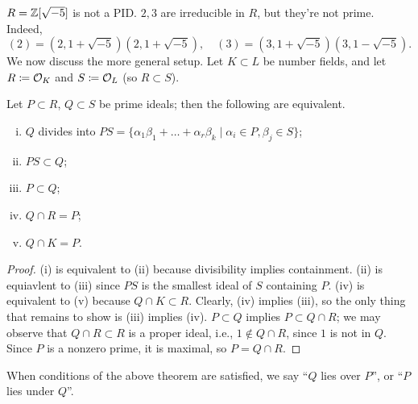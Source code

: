 $R = \mathbb Z[\sqrt{-5}]$ is not a PID. $2, 3$ are irreducible in $R$, but they're not prime. Indeed,
\[ (2) = (2, 1 + \sqrt{-5}) (2, 1 + \sqrt{-5}), \quad (3) = (3, 1 + \sqrt{-5})(3, 1 - \sqrt{-5}). \]
We now discuss the more general setup. Let $K \subset L$ be number fields, and let $R \coloneq \mathcal O_K$ and $S \coloneq \mathcal O_L$ (so $R \subset S$).
\begin{theorem} \label{thm:prime_ideals_of_number_fields_properties}
    Let $P \subset R$, $Q \subset S$ be prime ideals; then the following are equivalent.
    \begin{enumerate}[(i)]
        \item $Q$ divides into $P S = \{\alpha_1 \beta_1 + \dots + \alpha_r \beta_k \mid \alpha_i \in P, \beta_j \in S\}$;
        \item $PS \subset Q$;
        \item $P \subset Q$;
        \item $Q \cap R = P$;
        \item $Q \cap K = P$.
    \end{enumerate}
\end{theorem}
\begin{proof}
    (i) is equivalent to (ii) because divisibility implies containment. (ii) is equiavlent to (iii) since $PS$ is the smallest ideal of $S$ containing $P$. (iv) is equivalent to (v) because $Q \cap K \subset R$. Clearly, (iv) implies (iii), so the only thing that remains to show is (iii) implies (iv). $P \subset Q$ implies $P \subset Q \cap R$; we may observe that $Q \cap R \subset R$ is a proper ideal, i.e., $1 \notin Q \cap R$, since $1$ is not in $Q$. Since $P$ is a nonzero prime, it is maximal, so $P = Q \cap R$.
\end{proof}

\begin{definition} \label{defn:ideal_lies_above_ideal}
    When conditions of the above theorem are satisfied, we say ``$Q$ lies over $P$'', or ``$P$ lies under $Q$''.
\end{definition}

